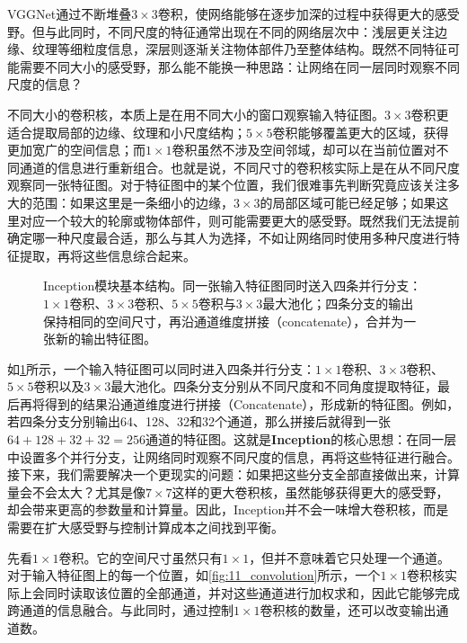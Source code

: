 VGGNet通过不断堆叠$3\times3$卷积，使网络能够在逐步加深的过程中获得更大的感受野。但与此同时，不同尺度的特征通常出现在不同的网络层次中：浅层更关注边缘、纹理等细粒度信息，深层则逐渐关注物体部件乃至整体结构。既然不同特征可能需要不同大小的感受野，那么能不能换一种思路：让网络在同一层同时观察不同尺度的信息？

不同大小的卷积核，本质上是在用不同大小的窗口观察输入特征图。$3\times3$卷积更适合提取局部的边缘、纹理和小尺度结构；$5\times5$卷积能够覆盖更大的区域，获得更加宽广的空间信息；而$1\times1$卷积虽然不涉及空间邻域，却可以在当前位置对不同通道的信息进行重新组合。也就是说，不同尺寸的卷积核实际上是在从不同尺度观察同一张特征图。对于特征图中的某个位置，我们很难事先判断究竟应该关注多大的范围：如果这里是一条细小的边缘，$3\times3$的局部区域可能已经足够；如果这里对应一个较大的轮廓或物体部件，则可能需要更大的感受野。既然我们无法提前确定哪一种尺度最合适，那么与其人为选择，不如让网络同时使用多种尺度进行特征提取，再将这些信息综合起来。

\begin{figure}[H]
    \caption{Inception模块基本结构。同一张输入特征图同时送入四条并行分支：$1\times1$卷积、$3\times3$卷积、$5\times5$卷积与$3\times3$最大池化；四条分支的输出保持相同的空间尺寸，再沿通道维度拼接（concatenate），合并为一张新的输出特征图。}
    \label{fig:inception}
\end{figure}

如\cref{fig:inception}所示，一个输入特征图可以同时进入四条并行分支：$1\times1$卷积、$3\times3$卷积、$5\times5$卷积以及$3\times3$最大池化。四条分支分别从不同尺度和不同角度提取特征，最后再将得到的结果沿通道维度进行拼接（Concatenate），形成新的特征图。例如，若四条分支分别输出64、128、32和32个通道，那么拼接后就得到一张$64+128+32+32=256$通道的特征图。这就是\textbf{Inception}的核心思想：在同一层中设置多个并行分支，让网络同时观察不同尺度的信息，再将这些特征进行融合。接下来，我们需要解决一个更现实的问题：如果把这些分支全部直接做出来，计算量会不会太大？尤其是像$7\times7$这样的更大卷积核，虽然能够获得更大的感受野，却会带来更高的参数量和计算量。因此，Inception并不会一味增大卷积核，而是需要在扩大感受野与控制计算成本之间找到平衡。

先看$1\times1$卷积。它的空间尺寸虽然只有$1\times1$，但并不意味着它只处理一个通道。对于输入特征图上的每一个位置，如\cref{fig:11_convolution}所示，一个$1\times1$卷积核实际上会同时读取该位置的全部通道，并对这些通道进行加权求和，因此它能够完成跨通道的信息融合。与此同时，通过控制$1\times1$卷积核的数量，还可以改变输出通道数。

